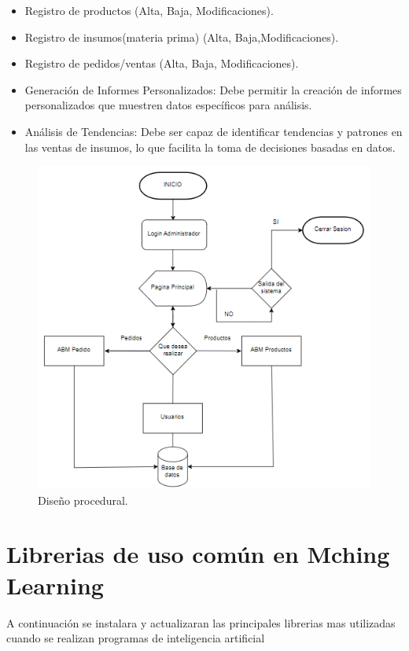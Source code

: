 \begin{itemize}
\item Registro de productos (Alta, Baja, Modificaciones).
\item Registro de insumos(materia prima) (Alta, Baja,Modificaciones). 
\item Registro de pedidos/ventas (Alta, Baja, Modificaciones).
\item Generación de Informes Personalizados: Debe permitir la creación de informes personalizados que muestren datos específicos para análisis.
\item Análisis de Tendencias: Debe ser capaz de identificar tendencias y patrones en las ventas de insumos, lo que facilita la toma de decisiones basadas en datos.

\end{itemize}
\begin{figure}[H]
    \begin{center}
      \includegraphics[scale=0.90]{./diseño_procedural.png}
      \caption{Diseño procedural.}
      \label{fig:diseño_procedural}
    \end{center}
  \end{figure}
  
\section{Librerias de uso común en Mching Learning}
A continuación se instalara y actualizaran las principales librerias mas utilizadas cuando se realizan programas de inteligencia artificial

